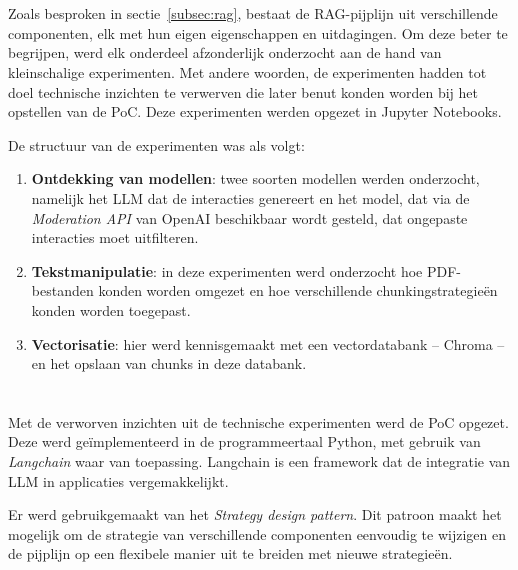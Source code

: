\section{}%
\label{sec:verkenning-onderdelen}

Zoals besproken in sectie~\ref{subsec:rag}, bestaat de RAG-pijplijn uit verschillende componenten, elk met hun eigen eigenschappen en uitdagingen. Om deze beter te begrijpen, werd elk onderdeel afzonderlijk onderzocht aan de hand van kleinschalige experimenten. Met andere woorden, de experimenten hadden tot doel technische inzichten te verwerven die later benut konden worden bij het opstellen van de PoC. Deze experimenten werden opgezet in Jupyter Notebooks. 

De structuur van de experimenten was als volgt:

\begin{enumerate}
    \item \textbf{Ontdekking van modellen}: twee soorten modellen werden onderzocht, namelijk het \acrshort{LLM} dat de interacties genereert en het model, dat via de \emph{Moderation API} van OpenAI beschikbaar wordt gesteld, dat ongepaste interacties moet uitfilteren.
    \item \textbf{Tekstmanipulatie}: in deze experimenten werd onderzocht hoe PDF-bestanden konden worden omgezet en hoe verschillende chunkingstrategieën konden worden toegepast.
    \item \textbf{Vectorisatie}: hier werd kennisgemaakt met een vectordatabank -- Chroma -- en het opslaan van chunks in deze databank.
\end{enumerate}

\section{}%
\label{sec:poc-opzetting}

Met de verworven inzichten uit de technische experimenten werd de PoC opgezet. Deze werd geïmplementeerd in de programmeertaal Python, met gebruik van \emph{Langchain} waar van toepassing. Langchain is een framework dat de integratie van \acrfull{LLM} in applicaties vergemakkelijkt.

Er werd gebruikgemaakt van het \emph{Strategy design pattern}. Dit patroon maakt het mogelijk om de strategie van verschillende componenten eenvoudig te wijzigen en de pijplijn op een flexibele manier uit te breiden met nieuwe strategieën.

